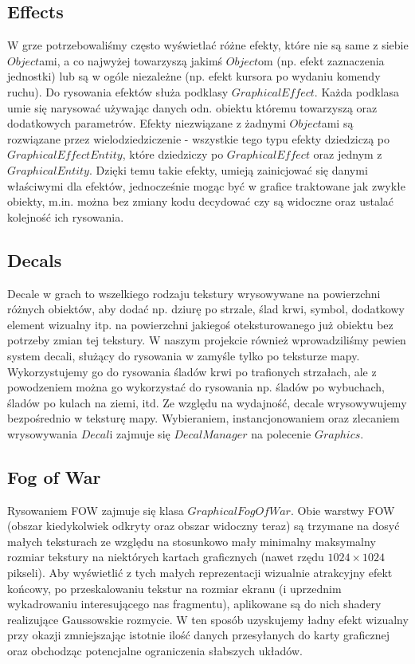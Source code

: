 \documentclass[licencjacka]{pracamgr}
\begin{document}
    \subsection{Effects}
      W grze potrzebowaliśmy często wyświetlać różne efekty, które nie są same z siebie $Object$ami, a co najwyżej
      towarzyszą jakimś $Object$om (np. efekt zaznaczenia jednostki) lub są w ogóle niezależne (np. efekt kursora po
      wydaniu komendy ruchu). Do rysowania efektów służa podklasy $GraphicalEffect$. Każda podklasa umie się narysować
      używając danych odn. obiektu któremu towarzyszą oraz dodatkowych parametrów. Efekty niezwiązane z żadnymi 
      $Object$ami są rozwiązane przez wielodziedziczenie - wszystkie tego typu efekty dziedziczą po 
      $GraphicalEffectEntity$, które dziedziczy po $GraphicalEffect$ oraz jednym z $GraphicalEntity$. Dzięki temu takie
      efekty, umieją zainicjować się danymi właściwymi dla efektów, jednocześnie mogąc być w grafice traktowane jak 
      zwykłe obiekty, m.in. można bez zmiany kodu decydować czy są widoczne oraz ustalać kolejność ich rysowania.
      
    \subsection{Decals}
      Decale w grach to wszelkiego rodzaju tekstury wrysowywane na powierzchni różnych obiektów, aby dodać np. dziurę
      po strzale, ślad krwi, symbol, dodatkowy element wizualny itp. na powierzchni jakiegoś oteksturowanego już obiektu
      bez potrzeby zmian tej tekstury. W naszym projekcie również wprowadziliśmy pewien system decali, służący do
      rysowania w zamyśle tylko po teksturze mapy. Wykorzystujemy go do rysowania śladów krwi po trafionych strzałach, 
      ale z powodzeniem można go wykorzystać do rysowania np. śladów po wybuchach, śladów po kulach na ziemi, itd. Ze
      względu na wydajność, decale wrysowywujemy bezpośrednio w teksturę mapy. Wybieraniem, instancjonowaniem oraz
      zlecaniem wrysowywania $Decal$i zajmuje się $DecalManager$ na polecenie $Graphics$.
      
    \subsection{Fog of War}
      Rysowaniem FOW zajmuje się klasa $GraphicalFogOfWar$. Obie warstwy FOW (obszar kiedykolwiek odkryty oraz obszar
      widoczny teraz) są trzymane na dosyć małych teksturach ze względu na stosunkowo mały minimalny maksymalny
      rozmiar tekstury na niektórych kartach graficznych (nawet rzędu $1024 \times 1024$ pikseli). Aby wyświetlić z 
      tych małych reprezentacji wizualnie atrakcyjny efekt końcowy, po przeskalowaniu tekstur na rozmiar ekranu 
      (i uprzednim wykadrowaniu interesującego nas fragmentu), aplikowane są do nich shadery realizujące Gaussowskie
      rozmycie. W ten sposób uzyskujemy ładny efekt wizualny przy okazji zmniejszając istotnie ilość danych przesyłanych
      do karty graficznej oraz obchodząc potencjalne ograniczenia słabszych układów.
      
\end{document}
